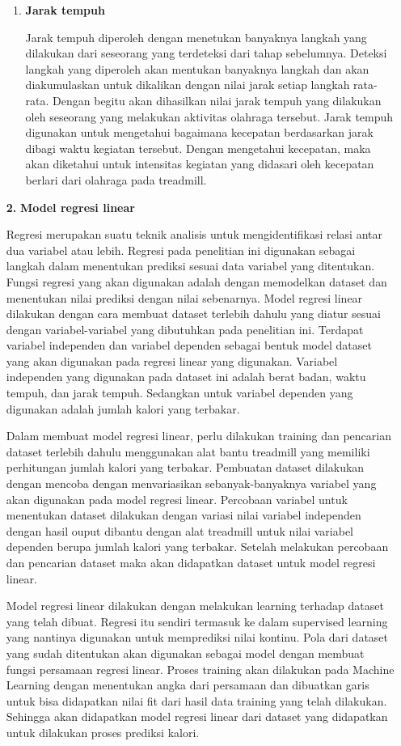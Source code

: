 \begin{enumerate}[listparindent=2em]
\begin{enumerate}[label=\textbf{\alph*}., listparindent=2em]
      \item \textbf{Jarak tempuh}
      
      Jarak tempuh diperoleh dengan menetukan banyaknya langkah yang dilakukan dari seseorang yang terdeteksi dari tahap sebelumnya. Deteksi langkah yang diperoleh akan mentukan banyaknya langkah dan akan diakumulaskan untuk dikalikan dengan nilai jarak setiap langkah rata-rata. Dengan begitu akan dihasilkan nilai jarak tempuh yang dilakukan oleh seseorang yang melakukan aktivitas olahraga tersebut. Jarak tempuh digunakan untuk mengetahui bagaimana kecepatan berdasarkan jarak dibagi waktu kegiatan tersebut. Dengan mengetahui kecepatan, maka akan diketahui untuk intensitas kegiatan yang didasari oleh kecepatan berlari dari olahraga pada treadmill.
    \end{enumerate}


    \item[\textbf{2.}] \textbf{Model regresi linear}

    Regresi merupakan suatu teknik analisis untuk mengidentifikasi relasi antar dua variabel atau lebih. Regresi pada penelitian ini digunakan sebagai langkah dalam menentukan prediksi sesuai data variabel yang ditentukan. Fungsi regresi yang akan digunakan adalah dengan memodelkan dataset dan menentukan nilai prediksi dengan nilai sebenarnya. Model regresi linear dilakukan dengan cara membuat dataset terlebih dahulu yang diatur sesuai dengan variabel-variabel yang dibutuhkan pada penelitian ini. Terdapat variabel independen dan variabel dependen sebagai bentuk model dataset yang akan digunakan pada regresi linear yang digunakan. Variabel independen yang digunakan pada dataset ini adalah berat badan, waktu tempuh, dan jarak tempuh. Sedangkan untuk variabel dependen yang digunakan adalah jumlah kalori yang terbakar.

    Dalam membuat model regresi linear, perlu dilakukan training dan pencarian dataset terlebih dahulu menggunakan alat bantu treadmill yang memiliki perhitungan jumlah kalori yang terbakar. Pembuatan dataset dilakukan dengan mencoba dengan menvariasikan sebanyak-banyaknya variabel yang akan digunakan pada model regresi linear. Percobaan variabel untuk menentukan dataset dilakukan dengan variasi nilai variabel independen dengan hasil ouput dibantu dengan alat treadmill untuk nilai variabel dependen berupa jumlah kalori yang terbakar. Setelah melakukan percobaan dan pencarian dataset maka akan didapatkan dataset untuk model regresi linear.

    Model regresi linear dilakukan dengan melakukan learning terhadap dataset yang telah dibuat. Regresi itu sendiri termasuk ke dalam supervised learning yang nantinya digunakan untuk memprediksi nilai kontinu. Pola dari dataset yang sudah ditentukan akan digunakan sebagai model dengan membuat fungsi persamaan regresi linear. Proses training akan dilakukan pada Machine Learning dengan menentukan angka dari persamaan dan dibuatkan garis untuk bisa didapatkan nilai fit dari hasil data training yang telah dilakukan. Sehingga akan didapatkan model regresi linear dari dataset yang didapatkan untuk dilakukan proses prediksi kalori.


\end{enumerate}
